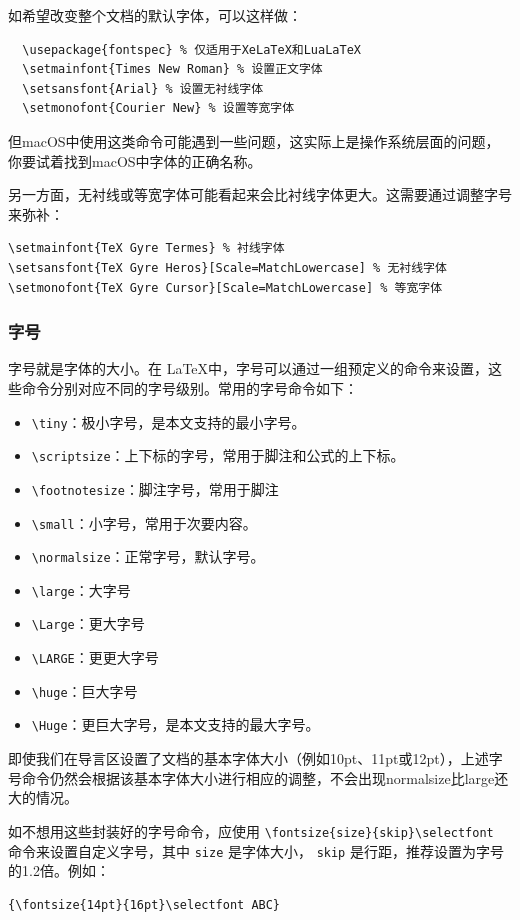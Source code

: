 如希望改变整个文档的默认字体，可以这样做：
\begin{verbatim}
  \usepackage{fontspec} % 仅适用于XeLaTeX和LuaLaTeX
  \setmainfont{Times New Roman} % 设置正文字体
  \setsansfont{Arial} % 设置无衬线字体
  \setmonofont{Courier New} % 设置等宽字体
\end{verbatim}
但macOS中使用这类命令可能遇到一些问题，这实际上是操作系统层面的问题，你要试着找到macOS中字体的正确名称。

另一方面，无衬线或等宽字体可能看起来会比衬线字体更大。这需要通过调整字号来弥补：
\begin{verbatim}
\setmainfont{TeX Gyre Termes} % 衬线字体
\setsansfont{TeX Gyre Heros}[Scale=MatchLowercase] % 无衬线字体
\setmonofont{TeX Gyre Cursor}[Scale=MatchLowercase] % 等宽字体
\end{verbatim}  

\subsubsection{字号}

字号就是字体的大小。在 \LaTeX 中，字号可以通过一组预定义的命令来设置，这些命令分别对应不同的字号级别。常用的字号命令如下：
\begin{itemize}
  \item \verb|\tiny|：极小字号，是本文支持的最小字号。
  \item \verb|\scriptsize|：上下标的字号，常用于脚注和公式的上下标。
  \item \verb|\footnotesize|：脚注字号，常用于脚注
  \item \verb|\small|：小字号，常用于次要内容。
  \item \verb|\normalsize|：正常字号，默认字号。
  \item \verb|\large|：大字号
  \item \verb|\Large|：更大字号
  \item \verb|\LARGE|：更更大字号
  \item \verb|\huge|：巨大字号
  \item \verb|\Huge|：更巨大字号，是本文支持的最大字号。
\end{itemize}

即使我们在导言区设置了文档的基本字体大小（例如10pt、11pt或12pt），上述字号命令仍然会根据该基本字体大小进行相应的调整，不会出现normalsize比large还大的情况。

如不想用这些封装好的字号命令，应使用 \verb|\fontsize{size}{skip}\selectfont| 命令来设置自定义字号，其中 \verb|size| 是字体大小， \verb|skip| 是行距，推荐设置为字号的1.2倍。例如：
\begin{verbatim}
{\fontsize{14pt}{16pt}\selectfont ABC}
\end{verbatim}

